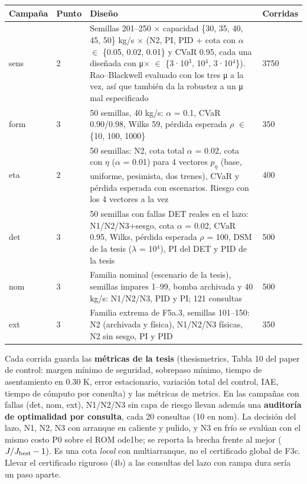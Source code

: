 \documentclass[11pt,a4paper]{article}
\newcommand{\codeus}{\textunderscore\allowbreak}
\newcommand{\code}[1]{{\small\ttfamily\let\_\codeus #1}}
\begin{document}
{\footnotesize
\begin{xltabular}{\linewidth}{@{}YYYY@{}}
\toprule
\textbf{Campaña} & \textbf{Punto} & \textbf{Diseño} & \textbf{Corridas} \\
\midrule
\endhead
\code{sens} & 2 & Semillas 201–250 $\times$ capacidad \{30, 35, 40, 45, 50\} kg/s $\times$ (N2, PI, PID + cota con $\alpha$ $\in$ \{0.05, 0.02, 0.01\} y CVaR 0.95, cada una diseñada con μ$\times$ $\in$ \{3·10$^{3}$, 10$^{4}$, 3·10$^{4}$\}). Rao–Blackwell evaluado con los tres μ a la vez, así que también da la robustez a un μ mal especificado & 3750 \\
\code{form} & 3 & 50 semillas, 40 kg/s: $\alpha$ = 0.1, CVaR 0.90/0.98, Wilks 59, pérdida esperada $\rho$ $\in$ \{10, 100, 1000\} & 350 \\
\code{eta} & 2 & 50 semillas: N2, cota total $\alpha$ = 0.02, cota con $\eta$ ($\alpha$ = 0.01) para 4 vectores $p_\eta$ (base, uniforme, pesimista, dos trenes), CVaR y pérdida esperada con escenarios. Riesgo con los 4 vectores a la vez & 400 \\
\code{det} & 3 & 50 semillas con fallas DET reales en el lazo: N1/N2/N3+sesgo, cota $\alpha$ = 0.02, CVaR 0.95, Wilks, pérdida esperada $\rho$ = 100, DSM de la tesis ($\lambda$ = 10$^{4}$), PI del DET y PID de la tesis & 500 \\
\code{nom} & 3 & Familia nominal (escenario de la tesis), semillas impares 1–99, bomba archivada y 40 kg/s: N1/N2/N3, PID y PI; 121 consultas & 500 \\
\code{ext} & 3 & Familia extrema de F5a.3, semillas 101–150: N2 (archivada y física), N1/N2/N3 físicas, N2 sin sesgo, PI y PID & 350 \\
\bottomrule
\end{xltabular}}

Cada corrida guarda las \textbf{métricas de la tesis} (\code{thesis\_metrics}, Tabla 10 del paper de control: margen mínimo de seguridad, sobrepaso mínimo, tiempo de asentamiento en 0.30 K, error estacionario, variación total del control, IAE, tiempo de cómputo por consulta) y las métricas de \code{metrics}. En las campañas con fallas (\code{det}, \code{nom}, \code{ext}), N1/N2/N3 sin capa de riesgo llevan además una \textbf{auditoría de optimalidad por consulta}, cada 20 consultas (10 en \code{nom}). La decisión del lazo, N1, N2, N3 con arranque en caliente y pulido, y N3 en frío se evalúan con el mismo costo P0 sobre el ROM ode1be; se reporta la brecha frente al mejor ($J/J_{\rm best}-1$). Es una cota \emph{local} con multiarranque, no el certificado global de F3c. Llevar el certificado riguroso (4b) a las consultas del lazo con rampa dura sería un paso aparte.
\end{document}
